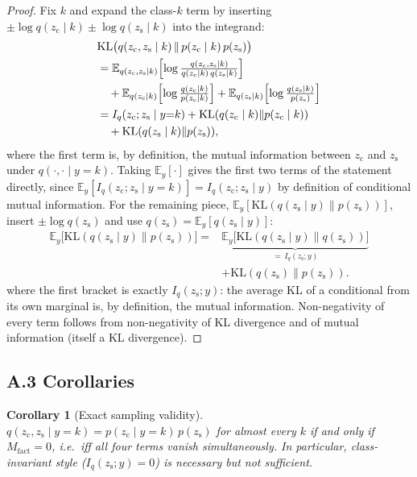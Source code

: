 \documentclass[letterpaper]{article}
\newtheorem{corollary}{Corollary}
\newcommand{\zc}{z_{\mathrm{c}}}
\newcommand{\zs}{z_{\mathrm{s}}}
\newcommand{\KL}{\mathrm{KL}}
\begin{document}
\begin{proof}
Fix $k$ and expand the class-$k$ term by inserting $\pm\log q(\zc\mid
k)\pm\log q(\zs\mid k)$ into the integrand:
\begin{align*}
&\KL\bigl(q(\zc,\zs\mid k)\,\|\,p(\zc\mid k)\,p(\zs)\bigr) \\
&= \mathbb E_{q(\zc,\zs\mid k)}\Bigl[\log\tfrac{q(\zc,\zs\mid k)}{q(\zc\mid k)\,q(\zs\mid k)}\Bigr]\\
&\quad + \mathbb E_{q(\zc\mid k)}\Bigl[\log\tfrac{q(\zc\mid k)}{p(\zc\mid k)}\Bigr]
 + \mathbb E_{q(\zs\mid k)}\Bigl[\log\tfrac{q(\zs\mid k)}{p(\zs)}\Bigr] \\
&= I_q(\zc;\zs\mid y{=}k) + \KL(q(\zc\mid k)\|p(\zc\mid k))\\
&\quad + \KL(q(\zs\mid k)\|p(\zs)),
\end{align*}
where the first term is, by definition, the mutual information between $\zc$
and $\zs$ under $q(\cdot,\cdot\mid y{=}k)$. Taking $\mathbb E_y[\cdot]$ gives
the first two terms of the statement directly, since $\mathbb
E_y[I_q(\zc;\zs\mid y{=}k)]=I_q(\zc;\zs\mid y)$ by definition of conditional
mutual information. For the remaining piece, $\mathbb E_y[\KL(q(\zs\mid
y)\|p(\zs))]$, insert $\pm\log q(\zs)$ and use $q(\zs)=\mathbb E_y[q(\zs\mid
y)]$:
\begin{align*}
\mathbb E_y\bigl[\KL(q(\zs\mid y)\|p(\zs))\bigr]
={}& \underbrace{\mathbb E_y\bigl[\KL(q(\zs\mid y)\|q(\zs))\bigr]}_{=\,I_q(\zs;y)}\\
&+ \KL(q(\zs)\|p(\zs)).
\end{align*}
where the first bracket is exactly $I_q(\zs;y)$: the average KL of a
conditional from its own marginal is, by definition, the mutual information.
Non-negativity of every term follows from non-negativity of KL divergence and
of mutual information (itself a KL divergence).
\end{proof}

\subsection{A.3 Corollaries}

\begin{corollary}[Exact sampling validity]
$q(\zc,\zs\mid y{=}k)=p(\zc\mid y{=}k)\,p(\zs)$ for almost every $k$ if and
only if $M_{\mathrm{fact}}=0$, i.e.\ iff all four terms vanish
simultaneously. In particular, class-invariant style ($I_q(\zs;y)=0$) is
necessary but not sufficient.
\end{corollary}
\end{document}
